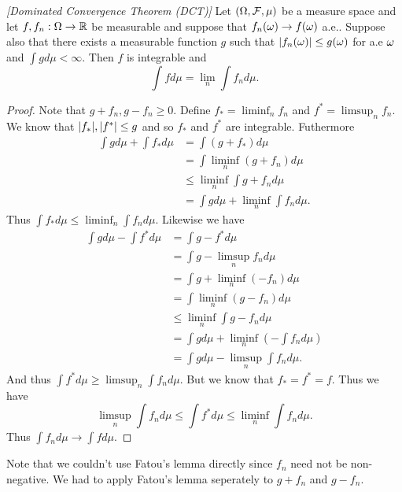 \begin{thrm}
    \emph{[Dominated Convergence Theorem (DCT)]} Let $({{\Omega}},{\mathcal{F}},\mu)$ be a measure space and let $f,f_n:{{\Omega}} \to {\mathbb R}$ be measurable and suppose that $f_n({\omega}) \to f({\omega})$ a.e.. Suppose also that there exists a measurable function $g$ such that ${\left\lvert f_n({\omega})\right\rvert} \le g({\omega})$ for a.e ${\omega}$ and $\int g d\mu < \infty$. Then $f$ is integrable and 
    \[\int f d\mu = \lim_n \int f_n d\mu. \] 
\end{thrm}
\begin{proof}
    Note that $g+f_n, g-f_n \ge 0$. Define $f_* = \liminf_n f_n$ and $f^* = \limsup_n f_n$. We know that ${\left\lvert f_*\right\rvert}, {\left\lvert f^*\right\rvert} \le g$ and so $f_*$ and $f^*$ are integrable. Futhermore
    \begin{align*}
        \int gd\mu + \int f_* d\mu &= \int (g+f_*)d\mu\\
        &= \int \liminf_n (g+f_n)d\mu \\
        &\le \liminf_n \int g+f_nd\mu \\
        &= \int gd\mu + \liminf_n \int f_n d\mu.
    \end{align*}
    Thus $\int f_*d\mu \le \liminf_n \int f_n d\mu$. Likewise we have
    \begin{align*}
        \int g d\mu - \int f^* d\mu &= \int g-f^* d\mu \\
        &= \int g - \limsup_n f_n d\mu \\
        &= \int g + \liminf_n (-f_n)d\mu \\
        &= \int \liminf_n(g-f_n) d\mu\\
        & \le \liminf_n \int g-f_n d\mu \\
        & = \int gd\mu +\liminf_n\left(-\int f_n d\mu\right)\\
        &= \int g d\mu - \limsup_n \int f_n d\mu.
    \end{align*}
    And thus $\int f^* d \mu \ge \limsup_n \int f_n d\mu$. But we know that $f_*=f^*=f$. Thus we have 
    \[\limsup_n \int f_n d\mu \le \int f^*d\mu \le \liminf_n \int f_n d\mu. \]
    Thus $\int f_n d\mu \to \int f d\mu$.
\end{proof}
Note that we couldn't use Fatou's lemma directly since $f_n$ need not be non-negative. We had to apply Fatou's lemma seperately to $g+f_n$ and $g-f_n$.
